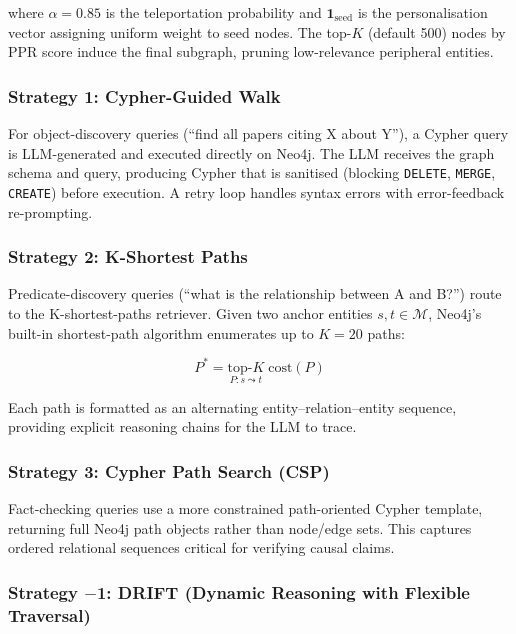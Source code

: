 \documentclass[12pt,a4paper]{article}
\begin{document}
where $\alpha = 0.85$ is the teleportation probability and
$\mathbf{1}_{\text{seed}}$ is the personalisation vector assigning uniform
weight to seed nodes. The top-$K$ (default 500) nodes by PPR score induce the
final subgraph, pruning low-relevance peripheral entities.

\subsubsection{Strategy 1: Cypher-Guided Walk}

For object-discovery queries (``find all papers citing X about Y''), a Cypher
query is LLM-generated and executed directly on Neo4j. The LLM receives the
graph schema and query, producing Cypher that is sanitised
(blocking \texttt{DELETE}, \texttt{MERGE}, \texttt{CREATE}) before execution.
A retry loop handles syntax errors with error-feedback re-prompting.

\subsubsection{Strategy 2: K-Shortest Paths}

Predicate-discovery queries (``what is the relationship between A and B?'')
route to the K-shortest-paths retriever. Given two anchor entities
$s, t \in \mathcal{M}$, Neo4j's built-in shortest-path algorithm enumerates
up to $K=20$ paths:

\begin{equation}
P^* = \underset{P : s \leadsto t}{\text{top-}K}\; \text{cost}(P)
\end{equation}

Each path is formatted as an alternating entity–relation–entity sequence,
providing explicit reasoning chains for the LLM to trace.

\subsubsection{Strategy 3: Cypher Path Search (CSP)}

Fact-checking queries use a more constrained path-oriented Cypher template,
returning full Neo4j path objects rather than node/edge sets. This captures
ordered relational sequences critical for verifying causal claims.

\subsubsection{Strategy $-$1: DRIFT (Dynamic Reasoning with Flexible Traversal)}
\end{document}

